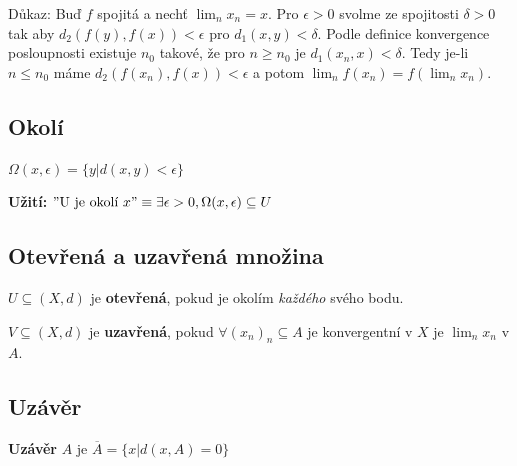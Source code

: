 \documentclass[../main.tex]{subfiles}
\begin{document}
Důkaz:
Buď $f$ spojitá a nechť $\lim_nx_n = x$. Pro $\epsilon > 0$ svolme ze spojitosti $\delta > 0$
tak aby $d_2(f(y),f(x)) <\epsilon$ pro $d_1(x,y) < \delta$.
Podle definice konvergence posloupnosti existuje $n_0$ takové, že pro $n\geq n_0$ je $d_1(x_n,x) < \delta$. Tedy je-li $n \leq n_0$
máme $d_2(f(x_n),f(x)) < \epsilon$ a potom $\lim_n f(x_n) = f(\lim_n x_n)$.
\noindent


\subsection{Okolí}
\hspace{1.2mm}
\noindent
$\Omega (x,\epsilon) = \{ y | d(x,y) < \epsilon \}$

\vspace{5mm}

\textbf{Užití:}
$"\textrm{U je okolí } x" \equiv \exists \epsilon > 0, \Omega (x,\epsilon) \subseteq U $

\subsection{Otevřená a uzavřená množina}
\hspace{1.2mm}
\noindent
$U \subseteq (X,d)$ je \textbf{otevřená}, pokud je okolím \textit{každého} svého bodu.

\vspace{5mm}

\hspace{1.2mm}
\noindent $V \subseteq (X,d)$ je \textbf{uzavřená}, pokud $\forall (x_n)_n \subseteq A$ je konvergentní
v $X$ je $\lim_n x_n$ v $A$.

\subsection{Uzávěr}
\hspace{1.2mm}
\noindent
\textbf{Uzávěr} $A$ je $\overline{A} = \{ x | d(x,A) = 0 \}$

\end{document}

